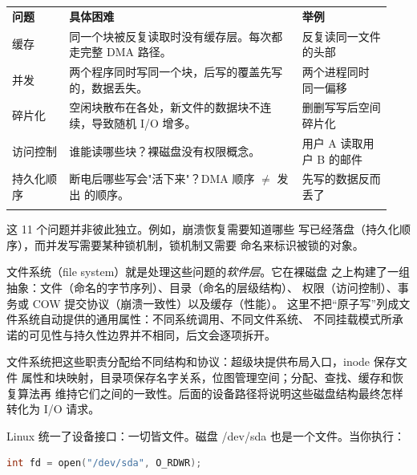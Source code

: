 \begin{filesystemlayout}
\begin{longtable}{|F{0.14\linewidth}|F{0.58\linewidth}|F{0.22\linewidth}|}
\hline
{}
\textbf{问题} & \textbf{具体困难} & \textbf{举例} \\\tablerowrule
\endhead
缓存 & 同一个块被反复读取时没有缓存层。每次都走完整 DMA 路径。 & 反复读同一文件的头部 \\\tablerowrule
并发 & 两个程序同时写同一个块，后写的覆盖先写的，数据丢失。 & 两个进程同时  同一偏移 \\\tablerowrule
碎片化 & 空闲块散布在各处，新文件的数据块不连续，导致随机 I/O 增多。 & 删删写写后空间碎片化 \\\tablerowrule
访问控制 & 谁能读哪些块？裸磁盘没有权限概念。 & 用户 A 读取用户 B 的邮件 \\\tablerowrule
持久化顺序 & 断电后哪些写会"活下来"？DMA 顺序 $\ne$ 发出  的顺序。 & 先写的数据反而丢了 \\\tablerowrule
\end{longtable}

这 11 个问题并非彼此独立。例如，崩溃恢复需要知道哪些
写已经落盘（持久化顺序），而并发写需要某种锁机制，锁机制又需要
命名来标识被锁的对象。

文件系统（file system）就是处理这些问题的\emph{软件层}。它在裸磁盘
之上构建了一组抽象：文件（命名的字节序列）、目录（命名的层级结构）、
权限（访问控制）、事务或 COW 提交协议（崩溃一致性）以及缓存（性能）。
这里不把“原子写”列成文件系统自动提供的通用属性：不同系统调用、不同文件系统、
不同挂载模式所承诺的可见性与持久性边界并不相同，后文会逐项拆开。

文件系统把这些职责分配给不同结构和协议：超级块提供布局入口，inode 保存文件
属性和块映射，目录项保存名字关系，位图管理空间；分配、查找、缓存和恢复算法再
维持它们之间的一致性。后面的设备路径将说明这些磁盘结构最终怎样转化为 I/O 请求。




Linux 统一了设备接口：一切皆文件。磁盘 /dev/sda 也是一个文件。当你执行：

\begin{lstlisting}[language=C]
int fd = open("/dev/sda", O_RDWR);
\end{lstlisting}


\end{filesystemlayout}

